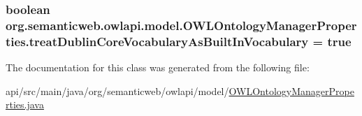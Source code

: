 \hypertarget{classorg_1_1semanticweb_1_1owlapi_1_1model_1_1_o_w_l_ontology_manager_properties_acb9009f12a2fad11a2962f1c262f34b6}{
\subsubsection[{treat\-Dublin\-Core\-Vocabulary\-As\-Built\-In\-Vocabulary}]{\setlength{\rightskip}{0pt plus 5cm}boolean org.\-semanticweb.\-owlapi.\-model.\-O\-W\-L\-Ontology\-Manager\-Properties.\-treat\-Dublin\-Core\-Vocabulary\-As\-Built\-In\-Vocabulary = true\hspace{0.3cm}{\ttfamily [private]}}}\label{classorg_1_1semanticweb_1_1owlapi_1_1model_1_1_o_w_l_ontology_manager_properties_acb9009f12a2fad11a2962f1c262f34b6}


The documentation for this class was generated from the following file\-:\begin{DoxyCompactItemize}
\item 
api/src/main/java/org/semanticweb/owlapi/model/\hyperlink{_o_w_l_ontology_manager_properties_8java}{O\-W\-L\-Ontology\-Manager\-Properties.\-java}\end{DoxyCompactItemize}
